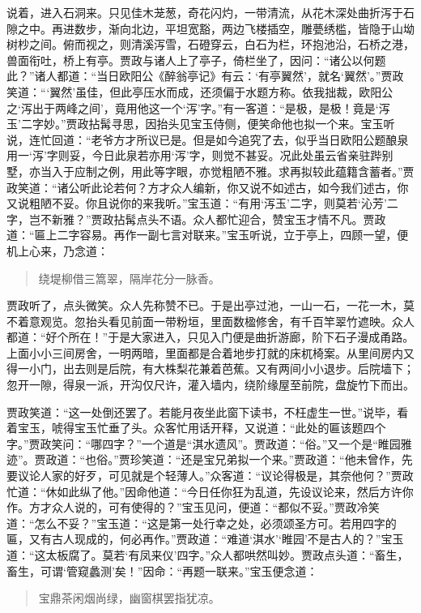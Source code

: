 \documentclass[12pt,oneside]{book}
\newenvironment{shici}{%
\begin{verse}%
\centering\large\hspace{12pt}}%
{\end{verse}}
\begin{document}
说着，进入石洞来。只见佳木茏葱，奇花闪灼，一带清流，从花木深处曲折泻于石隙之中。再进数步，渐向北边，平坦宽豁，两边飞楼插空，雕甍绣槛，皆隐于山坳树杪之间。俯而视之，则清溪泻雪，石磴穿云，白石为栏，环抱池沿，石桥之港，兽面衔吐，桥上有亭。贾政与诸人上了亭子，倚栏坐了，因问：“诸公以何题此？”诸人都道：“当日欧阳公《醉翁亭记》有云：‘有亭翼然’，就名‘翼然’。”贾政笑道：“‘翼然’虽佳，但此亭压水而成，还须偏于水题方称。依我拙裁，欧阳公之‘泻出于两峰之间’，竟用他这一个‘泻’字。”有一客道：“是极，是极！竟是‘泻玉’二字妙。”贾政拈髯寻思，因抬头见宝玉侍侧，便笑命他也拟一个来。宝玉听说，连忙回道：“老爷方才所议已是。但是如今追究了去，似乎当日欧阳公题酿泉用一‘泻’字则妥，今日此泉若亦用‘泻’字，则觉不甚妥。况此处虽云省亲驻跸别墅，亦当入于应制之例，用此等字眼，亦觉粗陋不雅。求再拟较此蕴籍含蓄者。”贾政笑道：“诸公听此论若何？方才众人编新，你又说不如述古，如今我们述古，你又说粗陋不妥。你且说你的来我听。”宝玉道：“有用‘泻玉’二字，则莫若‘沁芳’二字，岂不新雅？”贾政拈髯点头不语。众人都忙迎合，赞宝玉才情不凡。贾政道：“匾上二字容易。再作一副七言对联来。”宝玉听说，立于亭上，四顾一望，便机上心来，乃念道：


\begin{shici}
绕堤柳借三篙翠，隔岸花分一脉香。
\end{shici}

贾政听了，点头微笑。众人先称赞不已。于是出亭过池，一山一石，一花一木，莫不着意观览。忽抬头看见前面一带粉垣，里面数楹修舍，有千百竿翠竹遮映。众人都道：“好个所在！”于是大家进入，只见入门便是曲折游廊，阶下石子漫成甬路。上面小小三间房舍，一明两暗，里面都是合着地步打就的床杌椅案。从里间房内又得一小门，出去则是后院，有大株梨花兼着芭蕉。又有两间小小退步。后院墙下；忽开一隙，得泉一派，开沟仅尺许，灌入墙内，绕阶缘屋至前院，盘旋竹下而出。

贾政笑道：“这一处倒还罢了。若能月夜坐此窗下读书，不枉虚生一世。”说毕，看着宝玉，唬得宝玉忙垂了头。众客忙用话开释，又说道：“此处的匾该题四个字。”贾政笑问：“哪四字？”一个道是“淇水遗风”。贾政道：“俗。”又一个是“睢园雅迹”。贾政道：“也俗。”贾珍笑道：“还是宝兄弟拟一个来。”贾政道：“他未曾作，先要议论人家的好歹，可见就是个轻薄人。”众客道：“议论得极是，其奈他何？”贾政忙道：“休如此纵了他。”因命他道：“今日任你狂为乱道，先设议论来，然后方许你作。方才众人说的，可有使得的？”宝玉见问，便道：“都似不妥。”贾政冷笑道：“怎么不妥？”宝玉道：“这是第一处行幸之处，必须颂圣方可。若用四字的匾，又有古人现成的，何必再作。”贾政道：“难道‘淇水’‘睢园’不是古人的？”宝玉道：“这太板腐了。莫若‘有凤来仪’四字。”众人都哄然叫妙。贾政点头道：“畜生，畜生，可谓‘管窥蠡测’矣！”因命：“再题一联来。”宝玉便念道：

\begin{shici}
宝鼎茶闲烟尚绿，幽窗棋罢指犹凉。
\end{shici}
\end{document}
